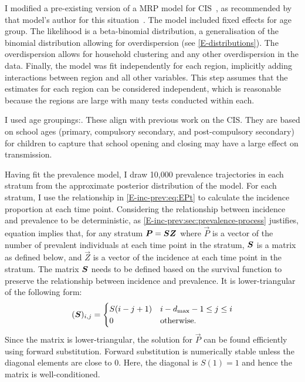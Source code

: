 \documentclass[thesis.tex]{subfiles}
\begin{document}
I modified a pre-existing version of a MRP model for CIS~\autocite{pouwelsMRPvaccination}, as recommended by that model's author for this situation~.
The model included fixed effects for age group.
The likelihood is a beta-binomial distribution, a generalisation of the binomial distribution allowing for overdispersion (see \cref{E-distributions}).
The overdispersion allows for household clustering and any other overdispersion in the data. 
Finally, the model was fit independently for each region, implicitly adding interactions between region and all other variables.
This step assumes that the estimates for each region can be considered independent, which is reasonable because the regions are large with many tests conducted within each.

I used age groupings:.
These align with previous work on the CIS.
They are based on school ages (primary, compulsory secondary, and post-compulsory secondary) for children to capture that school opening and closing may have a large effect on transmission.

Having fit the prevalence model, I draw 10,000 prevalence trajectories in each stratum from the approximate posterior distribution of the model.
For each stratum, I use the relationship in \cref{E-inc-prev:eq:EPt} to calculate the incidence proportion at each time point.
Considering the relationship between incidence and prevalence to be deterministic, as \cref{E-inc-prev:sec:prevalence-process} justifies, equation implies that, for any stratum $\bm{P} = \bm{S} \bm{Z}$ where $\vec{P}$ is a vector of the number of prevalent individuals at each time point in the stratum, $\bm{S}$ is a matrix as defined below, and $\vec{Z}$ is a vector of the incidence at each time point in the stratum.
The matrix $\bm{S}$ needs to be defined based on the survival function to preserve the relationship between incidence and prevalence.
It is lower-triangular of the following form:
\begin{align}
    (\bm{S})_{i,j} = \begin{cases}
        S(i - j + 1) & i - d_\text{max} - 1 \leq j \leq i \\
        0 & \text{otherwise.}
    \end{cases}
\end{align}
Since the matrix is lower-triangular, the solution for $\vec{P}$ can be found efficiently using forward substitution.
Forward substitution is numerically stable unless the diagonal elements are close to 0.
Here, the diagonal is $S(1) = 1$ and hence the matrix is well-conditioned.
\end{document}
